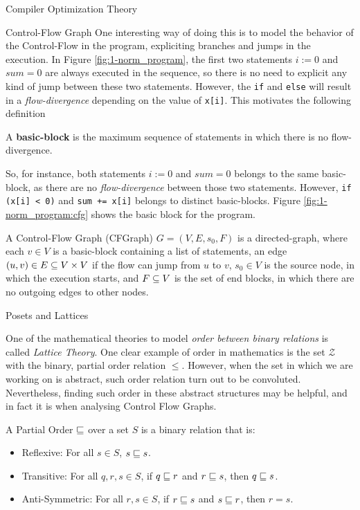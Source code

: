 \begin{section}{Compiler Optimization Theory}
\begin{subsubsection}{Control-Flow Graph}
One interesting way of doing this is to model the behavior of the Control-Flow
in the program, expliciting branches and jumps in the execution. In Figure
\ref{fig:1-norm_program}, the first two statements $i := 0$ and
$\textit{sum} = 0$ are always executed in the sequence, so there is no need to
explicit any kind of jump between these two statements. However, the
\texttt{if} and \texttt{else} will result in a \textit{flow-divergence}
depending on the value of \texttt{x[i]}. This motivates the following
definition
\begin{definition}
A \textbf{basic-block} is the maximum sequence of statements in which there is
no flow-divergence.
\end{definition}

So, for instance, both statements $i := 0$ and $\textit{sum} = 0$ belongs
to the same basic-block, as there are no \textit{flow-divergence} between
those two statements. However, \texttt{if (x[i] < 0)} and \texttt{sum += x[i]}
belongs to distinct basic-blocks. Figure \ref{fig:1-norm_program:cfg} shows
the basic block for the program.

\begin{definition}
	A Control-Flow Graph (CFGraph) $G = (V, E, s_0, F)$ is a directed-graph,
	where each $v \in V$ is a basic-block containing a list of statements,
	an edge $(u, v) \in E \subseteq V \times V$ if the flow can jump from
	$u$ to $v$, $s_0 \in V$ is the source node, in which the execution
	starts, and $F \subseteq V$ is the set of end blocks, in which there
	are no outgoing edges to other nodes.
\end{definition}

\end{subsubsection}

\begin{subsection}{Posets and Lattices}

One of the mathematical theories to model \textit{order between binary relations} is
called \textit{Lattice Theory}. One clear example of order in mathematics
is the set $\mathcal{Z}$ with the binary, partial order relation $\leq$. However,
when the set in which we are working on is abstract, such order relation turn out to be
convoluted. Nevertheless, finding such order in these abstract structures may be
helpful, and in fact it is when analysing Control Flow Graphs.

\begin{definition}
A Partial Order $\sqsubseteq$ over a set $S$ is a binary relation that is:
\begin{itemize}
	\item Reflexive: For all $s \in S$, $s \sqsubseteq s$.
	\item Transitive: For all $q, r, s \in S$, if $q \sqsubseteq r$ and $r \sqsubseteq s$, then
	$q \sqsubseteq s$.
	\item Anti-Symmetric: For all $r, s \in S$, if $r \sqsubseteq s$ and $s \sqsubseteq r$,
	then $r = s$.


\end{itemize}
\end{definition}
\end{subsection}
\end{section}
